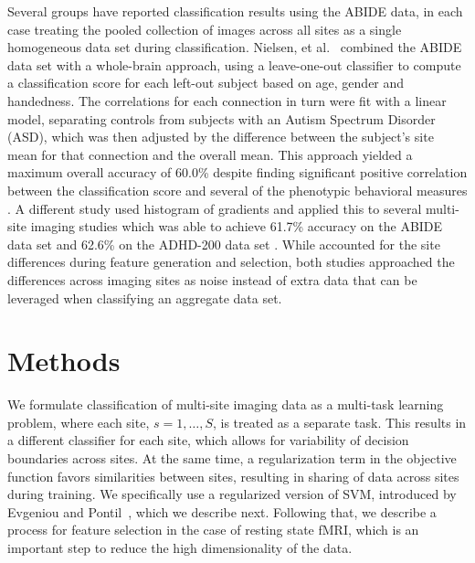 \documentclass{llncs}
\begin{document}
Several groups have reported classification results using the ABIDE data, in
each case treating the pooled collection of images across all sites as a single
homogeneous data set during classification. Nielsen, et al.~\cite{Jared} combined
the ABIDE data set with a whole-brain approach, using a leave-one-out classifier
to compute a classification score for each left-out subject based on age, gender
and handedness. The correlations for each connection in turn were fit with a
linear model, separating controls from subjects with an Autism Spectrum Disorder (ASD), which was then adjusted by the
difference between the subject's site mean for that connection and the overall
mean. This approach yielded a maximum overall accuracy of 60.0\% despite finding
significant positive correlation between the classification score and several of
the phenotypic behavioral measures \cite{Jared}. A different study used
histogram of gradients and applied this to several multi-site imaging studies
which was able to achieve 61.7\% accuracy on the ABIDE data set and 62.6\% on the
ADHD-200 data set \cite{ghiassian}. While \cite{Jared} accounted for the site
differences during feature generation and selection, both studies approached the
differences across imaging sites as noise instead of extra data that can be
leveraged when classifying an aggregate data set.



\section{Methods}
We formulate classification of multi-site imaging data as a multi-task learning
problem, where each site, $s = 1, \ldots, S$, is treated as a separate
task. This results in a different classifier for each site, which allows for
variability of decision boundaries across sites. At the same time, a regularization
term in the objective function favors similarities between sites, resulting in
sharing of data across sites during training. We specifically use a regularized
version of SVM, introduced by Evgeniou and Pontil~\cite{regMTL}, which we
describe next. Following that, we describe a process for feature selection in
the case of resting state fMRI, which is an important step to reduce the high
dimensionality of the data.
\end{document}
